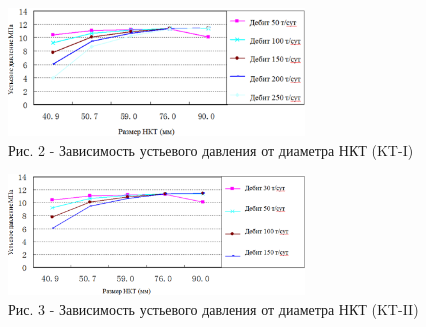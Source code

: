 \begin{figure}[H]
	\centering
	\includegraphics[width=0.7\textwidth]{assets/302}
	\caption*{Рис. 2 - Зависимость устьевого давления от диаметра НКТ (KT-I)}
\end{figure}

\begin{figure}[H]
	\centering
	\includegraphics[width=0.7\textwidth]{assets/303}
	\caption*{Рис. 3 - Зависимость устьевого давления от диаметра НКТ (KT-II)}
\end{figure}

